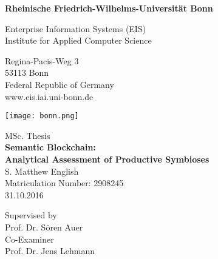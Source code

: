 \thispagestyle{empty}
\begin{center}

\vspace*{1.4cm}
{\LARGE \textbf{Rheinische Friedrich-Wilhelms-Universit{\"a}t Bonn}}

\vspace{0.5cm}

{\large Enterprise Information Systems (EIS)\\[1mm]}
{\large Institute for Applied Computer Science\\[5mm]}

Regina-Pacis-Weg 3\\
53113 Bonn\\
Federal Republic of Germany\\
www.eis.iai.uni-bonn.de\\

\vspace*{1cm}

\texttt{[image: bonn.png]}

\vspace*{1.0cm}

{\LARGE MSc. Thesis}\\

\vspace{1.0cm}
{\LARGE \textbf{Semantic Blockchain:}}\\
\vspace*{0.3cm}
{\LARGE \textbf{Analytical Assessment of Productive Symbioses}}\\
\vspace*{1.0cm}
{\LARGE S. Matthew English}
\\
\vspace*{0.5cm}
Matriculation Number: 2908245\\
31.10.2016\\ %
\vspace*{1.0cm}

Supervised by\\
Prof. Dr. S{\"o}ren Auer\\
\vspace*{0.5cm}
Co-Examiner\\
Prof. Dr. Jens Lehmann
\vspace{3cm}



\end{center}

